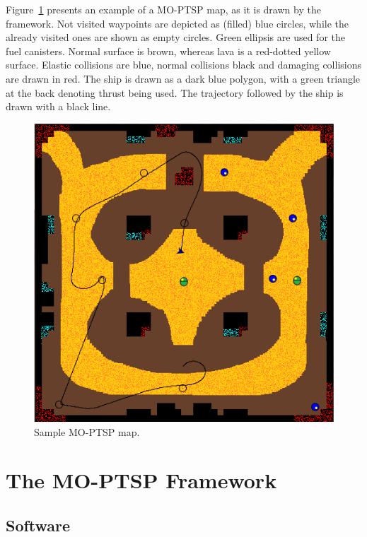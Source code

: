 \documentclass[conference]{IEEEtran}
\begin{document}
Figure~\ref{fig:sampleMap} presents an example of a MO-PTSP map, as it is drawn by the framework. Not visited waypoints are depicted as (filled) blue circles, while the already visited ones are shown as empty circles. Green ellipsis are used for the fuel canisters. Normal surface is brown, whereas lava is a red-dotted yellow surface. Elastic collisions are blue, normal collisions black and damaging collisions are drawn in red. The ship is drawn as a dark blue polygon, with a green triangle at the back denoting thrust being used. The trajectory followed by the ship is drawn with a black line.

\begin{figure} [!h]
	\begin{center}
	\includegraphics[scale=0.5]{img/sampleMap}
	\caption{Sample MO-PTSP map.}
	\label{fig:sampleMap}
	\end{center}
\end{figure}


\section{The MO-PTSP Framework} \label{sec:contr}


\subsection{Software} \label{ssec:software}
\end{document}
